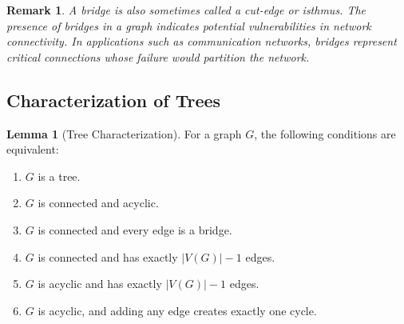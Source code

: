 \documentclass{article}
\newtheorem{remark}{Remark}
\theoremstyle{definition}
\newtheorem{lemma}{Lemma}
\begin{document}
\begin{remark}
A bridge is also sometimes called a cut-edge or isthmus. The presence of bridges in a graph indicates potential vulnerabilities in network connectivity. In applications such as communication networks, bridges represent critical connections whose failure would partition the network.
\end{remark}

\subsection{Characterization of Trees}

\begin{lemma}[Tree Characterization]
For a graph $G$, the following conditions are equivalent:
\begin{enumerate}
    \item $G$ is a tree.
    \item $G$ is connected and acyclic.
    \item $G$ is connected and every edge is a bridge.
    \item $G$ is connected and has exactly $|V(G)| - 1$ edges.
    \item $G$ is acyclic and has exactly $|V(G)| - 1$ edges.
    \item $G$ is acyclic, and adding any edge creates exactly one cycle.
\end{enumerate}
\end{lemma}
\end{document}
